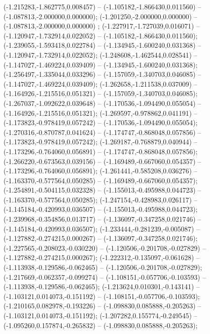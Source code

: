  (-1.215283,-1.862775,0.008457) -- (-1.105182,-1.866430,0.011560) -- (-1.087813,-2.000000,0.000000);
 (-1.201250,-2.000000,0.000000) -- (-1.087813,-2.000000,0.000000) ;
 (-1.227917,-1.727039,0.016071) -- (-1.120947,-1.732914,0.022052) -- (-1.105182,-1.866430,0.011560);
 (-1.239055,-1.593418,0.022784) -- (-1.134945,-1.600240,0.031368) -- (-1.120947,-1.732914,0.022052);
 (-1.248608,-1.462544,0.028541) -- (-1.147027,-1.469224,0.039409) -- (-1.134945,-1.600240,0.031368);
 (-1.256497,-1.335044,0.033296) -- (-1.157059,-1.340703,0.046085) -- (-1.147027,-1.469224,0.039409);
 (-1.262658,-1.211538,0.037009) -- (-1.164926,-1.215516,0.051321) -- (-1.157059,-1.340703,0.046085);
 (-1.267037,-1.092622,0.039648) -- (-1.170536,-1.094490,0.055054) -- (-1.164926,-1.215516,0.051321);
 (-1.269597,-0.978862,0.041191) -- (-1.173823,-0.978419,0.057242) -- (-1.170536,-1.094490,0.055054);
 (-1.270316,-0.870787,0.041624) -- (-1.174747,-0.868048,0.057856) -- (-1.173823,-0.978419,0.057242);
 (-1.269187,-0.768879,0.040944) -- (-1.173296,-0.764060,0.056891) -- (-1.174747,-0.868048,0.057856);
 (-1.266220,-0.673563,0.039156) -- (-1.169489,-0.667060,0.054357) -- (-1.173296,-0.764060,0.056891);
 (-1.261441,-0.585208,0.036276) -- (-1.163370,-0.577564,0.050285) -- (-1.169489,-0.667060,0.054357);
 (-1.254891,-0.504115,0.032328) -- (-1.155013,-0.495988,0.044723) -- (-1.163370,-0.577564,0.050285);
 (-1.247154,-0.428983,0.026117) -- (-1.145184,-0.420993,0.036507) -- (-1.155013,-0.495988,0.044723);
 (-1.239968,-0.354856,0.013717) -- (-1.136097,-0.347258,0.021746) -- (-1.145184,-0.420993,0.036507);
 (-1.233444,-0.281239,-0.005087) -- (-1.127882,-0.274215,0.000267) -- (-1.136097,-0.347258,0.021746);
 (-1.227565,-0.208023,-0.030220) -- (-1.120506,-0.201708,-0.027829) -- (-1.127882,-0.274215,0.000267);
 (-1.222312,-0.135097,-0.061628) -- (-1.113938,-0.129586,-0.062465) -- (-1.120506,-0.201708,-0.027829);
 (-1.217669,-0.062357,-0.099274) -- (-1.108151,-0.057706,-0.103593) -- (-1.113938,-0.129586,-0.062465);
 (-1.213624,0.010301,-0.143141) -- (-1.103121,0.014073,-0.151192) -- (-1.108151,-0.057706,-0.103593);
 (-1.210165,0.082978,-0.193226) -- (-1.098830,0.085888,-0.205263) -- (-1.103121,0.014073,-0.151192);
 (-1.207282,0.155774,-0.249545) -- (-1.095260,0.157874,-0.265832) -- (-1.098830,0.085888,-0.205263);
